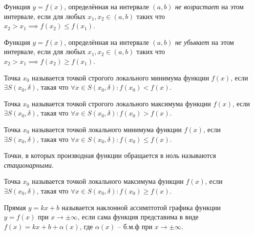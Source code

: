 \begin{definition} \label{def:69}
    Функция $y = f(x)$, определённая на интервале $(a, b)$ \textit{не возрастает} на этом интервале, если для любых  $x_1, x_2 \in (a, b)$ таких что $x_2 > x_1 \implies f(x_2) \le f(x_1)$.
\end{definition}


\begin{definition} \label{def:71}
    Функция $y = f(x)$, определённая на интервале $(a, b)$ \textit{не убывает} на этом интервале, если для любых  $x_1, x_2 \in (a, b)$ таких что $x_2 > x_1 \implies f(x_2) \ge f(x_1)$.
\end{definition}


\begin{definition} \label{def:74}
    Точка $x_0$ называется точкой строгого локального минимума функции $f (x)$, если $\exists S(x_0, \delta)$, такая что $\forall x \in S(x_0, \delta) : f (x_0) < f(x)$.
\end{definition}


\begin{definition} \label{def:75}
    Точка $x_0$ называется точкой строгого локального максимума функции $f (x)$, если $\exists S(x_0, \delta)$, такая что $\forall x \in S(x_0, \delta) : f (x_0) > f(x)$.
\end{definition}


\begin{definition} \label{def:76}
    Точка $x_0$ называется точкой локального минимума функции $f (x)$, если $\exists S(x_0, \delta)$, такая что $\forall x \in S(x_0, \delta) : f (x_0) \le f(x)$.
\end{definition}


\begin{definition} \label{def:81}
    Точки, в которых производная функции обращается в ноль называются \textit{стационарными}.
\end{definition}


\begin{definition} \label{def:77}
    Точка $x_0$ называется точкой локального максимума функции $f (x)$, если $\exists S(x_0, \delta)$, такая что $\forall x \in S(x_0, \delta) : f (x_0) \ge f(x)$.
\end{definition}


\begin{definition} \label{def:84}
    Прямая $y = kx + b$ называется наклонной ассимптотой графика функции  $y=f(x)$ при $x \to  \pm\infty$, если сама функция представима в виде $f(x) = kx + b + \alpha(x)$, где $\alpha(x)$ -- б.м.ф при $x \to \pm\infty$.
\end{definition}



